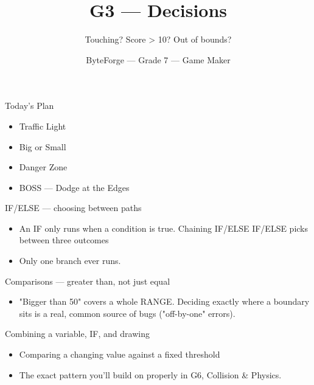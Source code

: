 \documentclass[aspectratio=169]{beamer}
\title{G3 — Decisions}
\subtitle{Touching? Score > 10? Out of bounds?}
\author{ByteForge --- Grade 7 --- Game Maker}
\date{}
\begin{document}
\begin{frame}
    \titlepage
\end{frame}

\begin{frame}{Today's Plan}
    \begin{itemize}
        \item Traffic Light
        \item Big or Small
        \item Danger Zone
        \item[$\bigstar$] BOSS --- Dodge at the Edges
    \end{itemize}
\end{frame}

\begin{frame}{IF/ELSE — choosing between paths}
    \large
    \begin{itemize}
        \item An IF only runs when a condition is true. Chaining IF/ELSE IF/ELSE picks between three outcomes
        \item Only one branch ever runs.
    \end{itemize}

    \begin{center}
    \end{center}
\end{frame}


\begin{frame}{Comparisons — greater than, not just equal}
    \large
    \begin{itemize}
        \item "Bigger than 50" covers a whole RANGE. Deciding exactly where a boundary sits is a real, common source of bugs ("off-by-one" errors).
    \end{itemize}
\end{frame}


\begin{frame}{Combining a variable, IF, and drawing}
    \large
    \begin{itemize}
        \item Comparing a changing value against a fixed threshold
        \item The exact pattern you'll build on properly in G6, Collision \& Physics.
    \end{itemize}
\end{frame}
\end{document}
